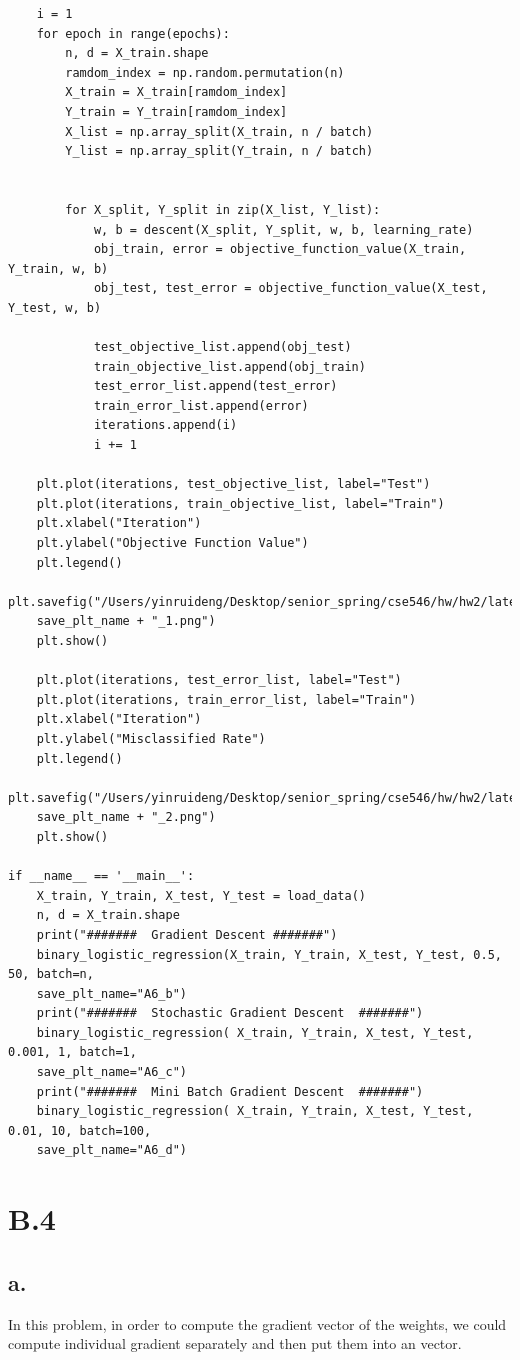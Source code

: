 \documentclass{article}
\begin{document}
\begin{verbatim}
	i = 1
	for epoch in range(epochs):
		n, d = X_train.shape
		ramdom_index = np.random.permutation(n) 
		X_train = X_train[ramdom_index]
		Y_train = Y_train[ramdom_index]
		X_list = np.array_split(X_train, n / batch)
		Y_list = np.array_split(Y_train, n / batch)
		

		for X_split, Y_split in zip(X_list, Y_list):
			w, b = descent(X_split, Y_split, w, b, learning_rate)
			obj_train, error = objective_function_value(X_train, Y_train, w, b)
			obj_test, test_error = objective_function_value(X_test, Y_test, w, b)
			
			test_objective_list.append(obj_test)
			train_objective_list.append(obj_train)
			test_error_list.append(test_error)
			train_error_list.append(error)
			iterations.append(i)
			i += 1
	
	plt.plot(iterations, test_objective_list, label="Test")
	plt.plot(iterations, train_objective_list, label="Train")
	plt.xlabel("Iteration")
	plt.ylabel("Objective Function Value")
	plt.legend()
	plt.savefig("/Users/yinruideng/Desktop/senior_spring/cse546/hw/hw2/latex/"+ 
	save_plt_name + "_1.png")
	plt.show()
	
	plt.plot(iterations, test_error_list, label="Test")
	plt.plot(iterations, train_error_list, label="Train")
	plt.xlabel("Iteration")
	plt.ylabel("Misclassified Rate")
	plt.legend()
	plt.savefig("/Users/yinruideng/Desktop/senior_spring/cse546/hw/hw2/latex/"+ 
	save_plt_name + "_2.png")
	plt.show()

if __name__ == '__main__':
	X_train, Y_train, X_test, Y_test = load_data()
	n, d = X_train.shape
	print("#######  Gradient Descent #######")
	binary_logistic_regression(X_train, Y_train, X_test, Y_test, 0.5, 50, batch=n, 
	save_plt_name="A6_b")
	print("#######  Stochastic Gradient Descent  #######")
	binary_logistic_regression( X_train, Y_train, X_test, Y_test, 0.001, 1, batch=1, 
	save_plt_name="A6_c")
	print("#######  Mini Batch Gradient Descent  #######")
	binary_logistic_regression( X_train, Y_train, X_test, Y_test, 0.01, 10, batch=100, 
	save_plt_name="A6_d")

\end{verbatim}

\section*{B.4}
\subsection*{a.}
In this problem, in order to compute the gradient vector of the weights, we could compute individual gradient separately and then put them into an vector.
\end{document}
